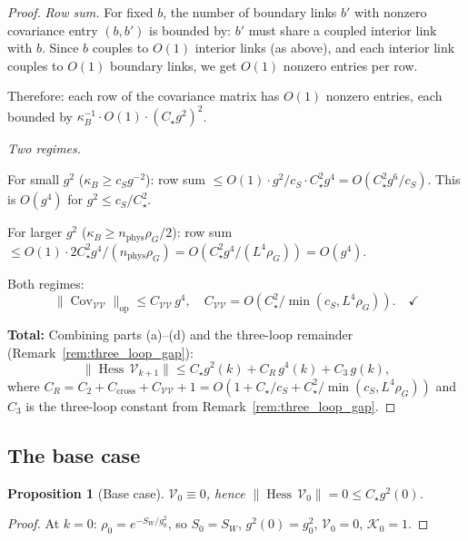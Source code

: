 \documentclass[11pt,a4paper]{article}
\theoremstyle{plain}
\newtheorem{proposition}[theorem]{Proposition}
\theoremstyle{definition}
\theoremstyle{remark}
\newcommand{\Cov}{\operatorname{Cov}}
\newcommand{\Hess}{\operatorname{Hess}}
\newcommand{\cV}{\mathcal{V}}
\newcommand{\cK}{\mathcal{K}}
\begin{document}
\begin{proof}
\emph{Row sum.} For fixed $b$, the number of boundary
links $b'$ with nonzero covariance entry $(b, b')$
is bounded by: $b'$ must share a coupled interior link
with $b$. Since $b$ couples to $O(1)$ interior links
(as above), and each interior link couples to $O(1)$
boundary links, we get $O(1)$ nonzero entries per row.

Therefore: each row of the covariance matrix has $O(1)$
nonzero entries, each bounded by
$\kappa_B^{-1} \cdot O(1) \cdot (C_\star g^2)^2$.

\emph{Two regimes.}

For small $g^2$ ($\kappa_B \ge c_S g^{-2}$):
row sum $\le O(1) \cdot g^2/c_S \cdot C_\star^2 g^4
= O(C_\star^2 g^6/c_S)$. This is $O(g^4)$ for
$g^2 \le c_S/C_\star^2$.

For larger $g^2$ ($\kappa_B \ge n_{\mathrm{phys}}\rho_G/2$):
row sum $\le O(1) \cdot 2C_\star^2 g^4/(n_{\mathrm{phys}}\rho_G)
= O(C_\star^2 g^4/(L^4\rho_G)) = O(g^4)$.

Both regimes:
\begin{equation}
  \|\Cov_{\cV\cV}\|_{\mathrm{op}}
  \le C_{\cV\cV}\,g^4, \quad
  C_{\cV\cV} = O(C_\star^2 / \min(c_S, L^4\rho_G)).
  \quad\checkmark
\end{equation}

\medskip\noindent
\textbf{Total:} Combining parts (a)--(d) and the
three-loop remainder (Remark~\ref{rem:three_loop_gap}):
\begin{equation}
  \|\Hess\,\cV_{k+1}\| \le C_\star g^2(k)
  + C_R\,g^4(k) + C_3\,g(k),
\end{equation}
where $C_R = C_2 + C_{\mathrm{cross}} + C_{\cV\cV} + 1
= O(1 + C_\star/c_S + C_\star^2/\min(c_S, L^4\rho_G))$
and $C_3$ is the three-loop constant from
Remark~\ref{rem:three_loop_gap}.
\end{proof}

\subsection{The base case}

\begin{proposition}[Base case]\label{prop:base}
$\cV_0 \equiv 0$, hence $\|\Hess\,\cV_0\| = 0
\le C_\star g^2(0)$.
\end{proposition}

\begin{proof}
At $k=0$: $\rho_0 = e^{-S_W/g_0^2}$, so $S_0 = S_W$,
$g^2(0) = g_0^2$, $\cV_0 = 0$, $\cK_0 = 1$.
\end{proof}
\end{document}

